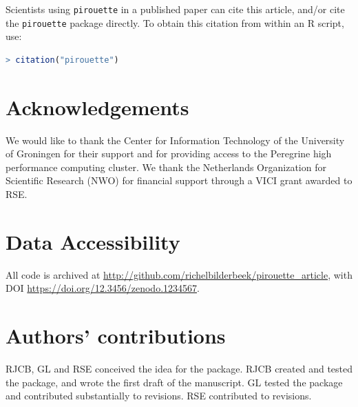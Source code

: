\documentclass{article}
\begin{document}
Scientists using \verb;pirouette; in a published paper can cite this
article, and/or cite the \verb;pirouette; package 
directly. To obtain this citation from within an R script, use:

\begin{lstlisting}[language=R]
> citation("pirouette")
\end{lstlisting}

\section{Acknowledgements}

We would like to thank the Center for Information Technology of the University 
of Groningen for their support and for providing access to the Peregrine 
high performance computing cluster. 
We thank the Netherlands 
Organization for Scientific Research (NWO) for financial support 
through a VICI grant awarded to RSE.

\section{Data Accessibility}

All code is archived at \url{http://github.com/richelbilderbeek/pirouette_article},
with DOI \url{https://doi.org/12.3456/zenodo.1234567}.

\section{Authors' contributions}

RJCB, GL and RSE conceived the idea for the package. 
RJCB created and tested the package, and wrote the first draft of the manuscript.
GL tested the package and contributed substantially to revisions.
RSE contributed to revisions.



\end{document}
